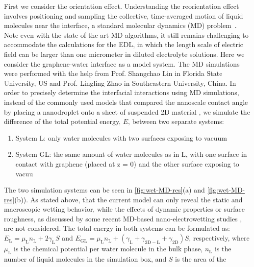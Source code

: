 First we consider the orientation effect. Understanding the
reorientation effect involves positioning and sampling the collective,
time-averaged motion of liquid molecules near the interface, a
standard molecular dynamics (MD)
problem~.
%
Note even with the
state-of-the-art MD algorithms, it still remains challenging to accommodate
the calculations for the EDL, in which the length scale of electric
field can be larger than one micrometer in diluted electrolyte
solutions.
Here we consider the graphene-water interface as a model system. The
MD simulations were performed with the help from Prof. Shangchao Lin
in Florida State University, US and Prof. Lingling Zhao in
Southeastern University, China.
%
In order to precisely determine the interfacial interactions using MD
simulations, instead of the commonly used models that compared the
nanoscale contact angle by placing a nano\-droplet onto a sheet of
suspended 2D material
\cite{Ostrowski_2014_tunable,Daub_2007_nanoscale_EW,Ren_2015_interfacial,Taherian_2015_asym_EW},
we simulate the difference of the total potential energy,
\(E\), between two separate systems:
\begin{enumerate}
\item System L: only water molecules with two surfaces exposing to vacuum
  
\item System GL: the same amount of water molecules as in L, with one
  surface in contact with graphene (placed at z = 0) and the other
  surface exposing to vacuu
\end{enumerate}
%
The two simulation systems can be seen in \autoref{fig:wet-MD-res}(a) and
\autoref{fig:wet-MD-res}(b)). 
%
As stated above, that the current model can only reveal the static and
macroscopic wetting behavior, while the effects of dynamic properties
or surface roughness, as discussed by some recent MD-based
nano-electrowetting studies \cite{Yuan_2010_PF,Zhao_2015_pillar}, are
not considered.
%
The total energy in both systems
can be formulated as:
\(E_{\mathrm{L}} = \mu_{\mathrm{L}}n_{\mathrm{L}} +
2\gamma_{\mathrm{L}}S\) and
\(E_{\mathrm{GL}}=\mu_{\mathrm{L}}n_{\mathrm{L}}+(\gamma_{\mathrm{L}}
+ \gamma_{\mathrm{2D-L}} + \gamma_{\mathrm{2D}})S\), respectively,
where \(\mu_{\mathrm{L}}\) is the chemical potential per water
molecule in the bulk phase, \(n_{\mathrm{L}}\) is the number of liquid
molecules in the simulation box, and \(S\) is the area of the 
